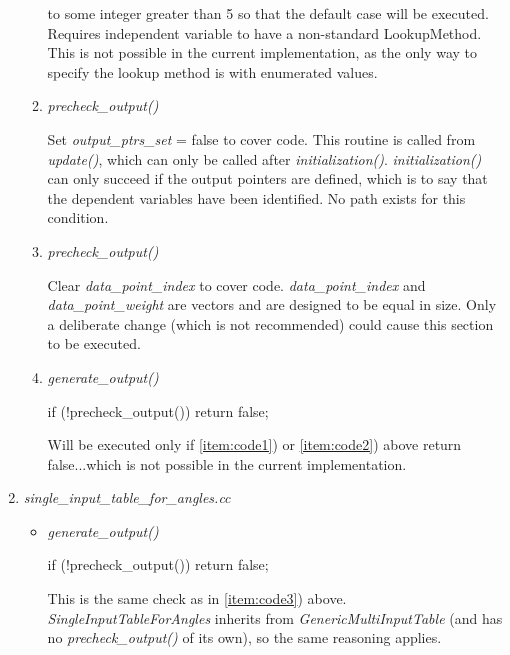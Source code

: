 \documentclass[11pt,fleqn]{report}
\begin{document}
\begin{enumerate}
\begin{enumerate}
      \begin{code}
switch ((*indep_iter).second) {
      \end{code}
      to some integer greater than 5 so that the default case will be executed.
Requires independent variable to have a non-standard LookupMethod.  This is not
 possible in the current implementation, as the only way to specify the lookup
 method is with enumerated values.
      \item \label{item:code1} \textit{precheck\_output()}
      \begin{code}
if (!output_ptrs_set) {
      \end{code}
      Set \textit{output\_ptrs\_set} = false to cover code.  This routine is called
 from \textit{update()}, which can only be called after \textit{initialization()}.
  \textit{initialization()} can only succeed if the output pointers are defined,
  which is to say that the dependent variables have been identified.  No path
  exists for this condition.
      \item \label{item:code2} \textit{precheck\_output()}
      \begin{code}
if (data_point_index.size()!=data_point_weight.size()){
    MessageHandler::error(
      \end{code}
      Clear \textit{data\_point\_index} to cover code.  \textit{data\_point\_index}
       and \textit{data\_point\_weight} are vectors and are designed to be equal in
        size.  Only a deliberate change (which is not recommended) could cause this
         section to be executed.
      \item \label{item:code3} \textit{generate\_output()}
      \begin{code}
if (!precheck_output()) {
    return false;
  }
      \end{code}
      Will be executed only if \ref{item:code1}) or \ref{item:code2}) above return
       false...which is not possible in the current implementation.
   \end{enumerate}

 \item \textit{single\_input\_table\_for\_angles.cc}
   \begin{itemize}
      \item \textit{generate\_output()}
      \begin{code}
  if (!precheck_output()) {
    return false;
  }
      \end{code}
      This is the same check as in \ref{item:code3}) above.
      \textit{SingleInputTableForAngles} inherits from
       \textit{GenericMultiInputTable} (and has no \textit{precheck\_output()} of
       its own), so the same reasoning applies.
   \end{itemize}


\end{enumerate}
\end{document}
